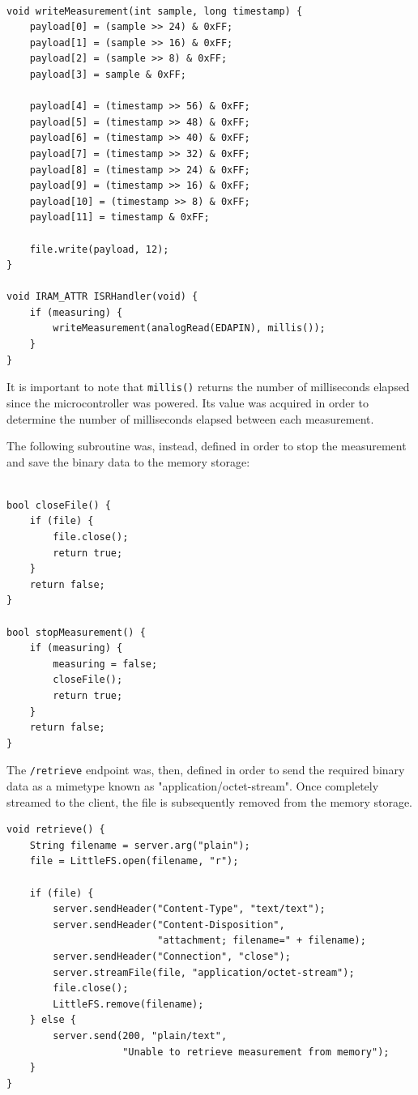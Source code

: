 
\begin{verbatim}

void writeMeasurement(int sample, long timestamp) {
    payload[0] = (sample >> 24) & 0xFF;
    payload[1] = (sample >> 16) & 0xFF;
    payload[2] = (sample >> 8) & 0xFF;
    payload[3] = sample & 0xFF;  

    payload[4] = (timestamp >> 56) & 0xFF;
    payload[5] = (timestamp >> 48) & 0xFF;
    payload[6] = (timestamp >> 40) & 0xFF;
    payload[7] = (timestamp >> 32) & 0xFF;
    payload[8] = (timestamp >> 24) & 0xFF;
    payload[9] = (timestamp >> 16) & 0xFF;
    payload[10] = (timestamp >> 8) & 0xFF;
    payload[11] = timestamp & 0xFF;

    file.write(payload, 12);
}

void IRAM_ATTR ISRHandler(void) {
    if (measuring) {
        writeMeasurement(analogRead(EDAPIN), millis());
    }
}
\end{verbatim}

It is important to note that \texttt{millis()} returns the number of milliseconds elapsed since the microcontroller was powered. Its value was acquired in order to determine the number of milliseconds elapsed between each measurement.

The following subroutine was, instead, defined in order to stop the measurement and save the binary data to the memory storage:


\begin{verbatim}

bool closeFile() {
    if (file) {
        file.close();
        return true;
    }
    return false;
}

bool stopMeasurement() {
    if (measuring) {
        measuring = false;
        closeFile();
        return true;
    }
    return false;
}
\end{verbatim}

The \texttt{/retrieve} endpoint was, then, defined in order to send the required binary data as a mimetype known as "application/octet-stream". Once completely streamed to the client, the file is subsequently removed from the memory storage.

\begin{verbatim}
void retrieve() {
    String filename = server.arg("plain");
    file = LittleFS.open(filename, "r");

    if (file) {
        server.sendHeader("Content-Type", "text/text");
        server.sendHeader("Content-Disposition", 
                          "attachment; filename=" + filename);
        server.sendHeader("Connection", "close");
        server.streamFile(file, "application/octet-stream");
        file.close();
        LittleFS.remove(filename);
    } else {
        server.send(200, "plain/text", 
                    "Unable to retrieve measurement from memory");
    }
}
\end{verbatim}

